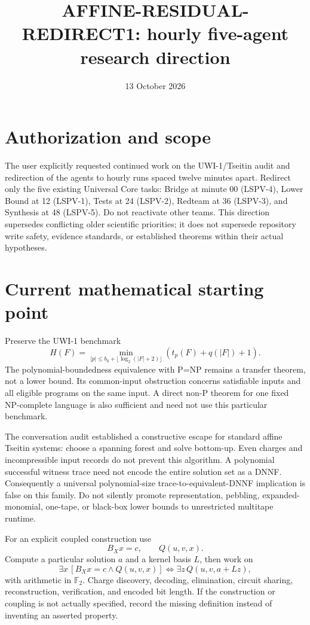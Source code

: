 \documentclass[11pt]{article}
\begin{document}
\title{AFFINE-RESIDUAL-REDIRECT1: hourly five-agent research direction}
\date{13 October 2026}
\maketitle
\section*{Authorization and scope}
The user explicitly requested continued work on the UWI-1/Tseitin audit and redirection of the agents to hourly runs spaced twelve minutes apart. Redirect only the five existing Universal Core tasks: Bridge at minute 00 (LSPV-4), Lower Bound at 12 (LSPV-1), Tests at 24 (LSPV-2), Redteam at 36 (LSPV-3), and Synthesis at 48 (LSPV-5). Do not reactivate other teams. This direction supersedes conflicting older scientific priorities; it does not supersede repository write safety, evidence standards, or established theorems within their actual hypotheses.
\section*{Current mathematical starting point}
Preserve the UWI-1 benchmark
\[
H(F)=\min_{|p|\le b_0+\lfloor\log_2(|F|+2)\rfloor}
       (t_p(F)+q(|F|)+1).
\]
The polynomial-boundedness equivalence with P=NP remains a transfer theorem, not a lower bound. Its common-input obstruction concerns satisfiable inputs and all eligible programs on the same input. A direct non-P theorem for one fixed NP-complete language is also sufficient and need not use this particular benchmark.

The conversation audit established a constructive escape for standard affine Tseitin systems: choose a spanning forest and solve bottom-up. Even charges and incompressible input records do not prevent this algorithm. A polynomial successful witness trace need not encode the entire solution set as a DNNF. Consequently a universal polynomial-size trace-to-equivalent-DNNF implication is false on this family. Do not silently promote representation, pebbling, expanded-monomial, one-tape, or black-box lower bounds to unrestricted multitape runtime.

For an explicit coupled construction use
\[
B_Xx=c,\qquad Q(u,v,x).
\]
Compute a particular solution $a$ and a kernel basis $L$, then work on
\[
\exists x\,[B_Xx=c\land Q(u,v,x)]
\iff \exists z\,Q(u,v,a+Lz),
\]
with arithmetic in $\mathbb F_2$. Charge discovery, decoding, elimination, circuit sharing, reconstruction, verification, and encoded bit length. If the construction or coupling is not actually specified, record the missing definition instead of inventing an asserted property.
\end{document}
